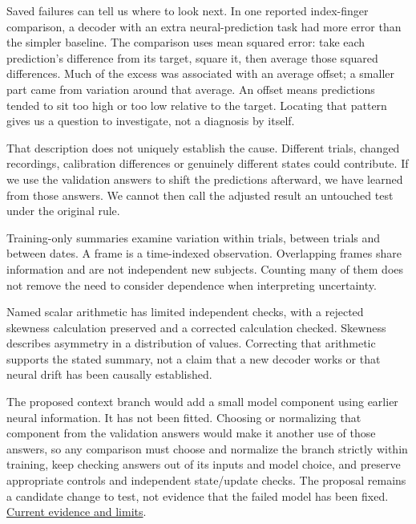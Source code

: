 Saved failures can tell us where to look next. In one reported index-finger comparison, a decoder with an extra neural-prediction task had more error than the simpler baseline. The comparison uses mean squared error: take each prediction's difference from its target, square it, then average those squared differences. Much of the excess was associated with an average offset; a smaller part came from variation around that average. An offset means predictions tended to sit too high or too low relative to the target. Locating that pattern gives us a question to investigate, not a diagnosis by itself.\par

That description does not uniquely establish the cause. Different trials, changed recordings, calibration differences or genuinely different states could contribute. If we use the validation answers to shift the predictions afterward, we have learned from those answers. We cannot then call the adjusted result an untouched test under the original rule.\par

Training-only summaries examine variation within trials, between trials and between dates. A frame is a time-indexed observation. Overlapping frames share information and are not independent new subjects. Counting many of them does not remove the need to consider dependence when interpreting uncertainty.\par

Named scalar arithmetic has limited independent checks, with a rejected skewness calculation preserved and a corrected calculation checked. Skewness describes asymmetry in a distribution of values. Correcting that arithmetic supports the stated summary, not a claim that a new decoder works or that neural drift has been causally established.\par

The proposed context branch would add a small model component using earlier neural information. It has not been fitted. Choosing or normalizing that component from the validation answers would make it another use of those answers, so any comparison must choose and normalize the branch strictly within training, keep checking answers out of its inputs and model choice, and preserve appropriate controls and independent state/update checks. The proposal remains a candidate change to test, not evidence that the failed model has been fixed. \href{research-evidence.json}{Current evidence and limits}.\par

